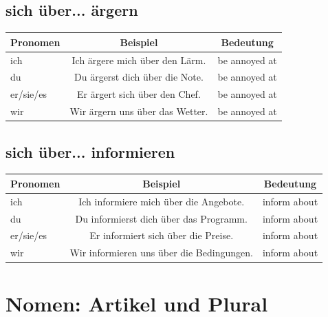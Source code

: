 \subsection{sich über... ärgern}
\begin{center}
\begin{tabular}{|l|c|c|}
\hline
\textbf{Pronomen} & \textbf{Beispiel} & \textbf{Bedeutung} \\ \hline
ich & Ich ärgere mich über den Lärm. & be annoyed at \\ \hline
du & Du ärgerst dich über die Note. & be annoyed at \\ \hline
er/sie/es & Er ärgert sich über den Chef. & be annoyed at \\ \hline
wir & Wir ärgern uns über das Wetter. & be annoyed at \\ \hline
\end{tabular}
\end{center}

\subsection{sich über... informieren}
\begin{center}
\begin{tabular}{|l|c|c|}
\hline
\textbf{Pronomen} & \textbf{Beispiel} & \textbf{Bedeutung} \\ \hline
ich & Ich informiere mich über die Angebote. & inform about \\ \hline
du & Du informierst dich über das Programm. & inform about \\ \hline
er/sie/es & Er informiert sich über die Preise. & inform about \\ \hline
wir & Wir informieren uns über die Bedingungen. & inform about \\ \hline
\end{tabular}
\end{center}

\section{Nomen: Artikel und Plural}
\label{sec:NomenArtikel}

